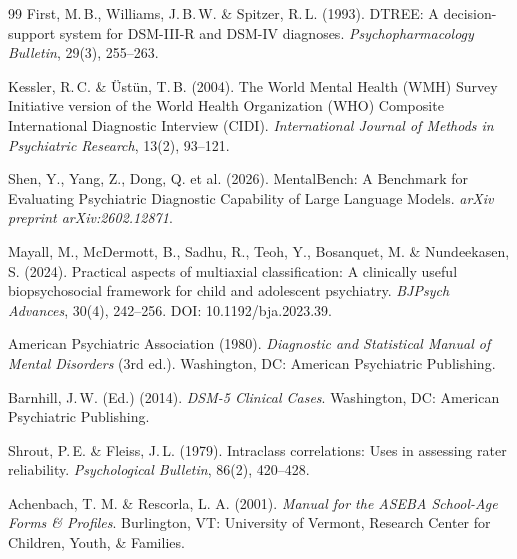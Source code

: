 \documentclass[11pt,a4paper]{article}
\begin{document}
\begin{thebibliography}{99}
First, M.\,B., Williams, J.\,B.\,W. \& Spitzer, R.\,L. (1993).
\newblock DTREE: A decision-support system for DSM-III-R and DSM-IV diagnoses.
\newblock \textit{Psychopharmacology Bulletin}, 29(3), 255--263.

Kessler, R.\,C. \& \"{U}st\"{u}n, T.\,B. (2004).
\newblock The World Mental Health (WMH) Survey Initiative version of the World Health Organization (WHO) Composite International Diagnostic Interview (CIDI).
\newblock \textit{International Journal of Methods in Psychiatric Research}, 13(2), 93--121.

Shen, Y., Yang, Z., Dong, Q. et al. (2026).
\newblock MentalBench: A Benchmark for Evaluating Psychiatric Diagnostic Capability of Large Language Models.
\newblock \textit{arXiv preprint arXiv:2602.12871}.

Mayall, M., McDermott, B., Sadhu, R., Teoh, Y., Bosanquet, M. \& Nundeekasen, S. (2024).
\newblock Practical aspects of multiaxial classification: A clinically useful biopsychosocial framework for child and adolescent psychiatry.
\newblock \textit{BJPsych Advances}, 30(4), 242--256. DOI: 10.1192/bja.2023.39.

American Psychiatric Association (1980).
\newblock \textit{Diagnostic and Statistical Manual of Mental Disorders} (3rd ed.).
\newblock Washington, DC: American Psychiatric Publishing.

Barnhill, J.\,W. (Ed.) (2014).
\newblock \textit{DSM-5 Clinical Cases}.
\newblock Washington, DC: American Psychiatric Publishing.

Shrout, P.\,E. \& Fleiss, J.\,L. (1979).
\newblock Intraclass correlations: Uses in assessing rater reliability.
\newblock \textit{Psychological Bulletin}, 86(2), 420--428.

Achenbach, T. M. \& Rescorla, L. A. (2001).
\newblock \textit{Manual for the ASEBA School-Age Forms \& Profiles}.
\newblock Burlington, VT: University of Vermont, Research Center for Children, Youth, \& Families.

\end{thebibliography}
\end{document}
